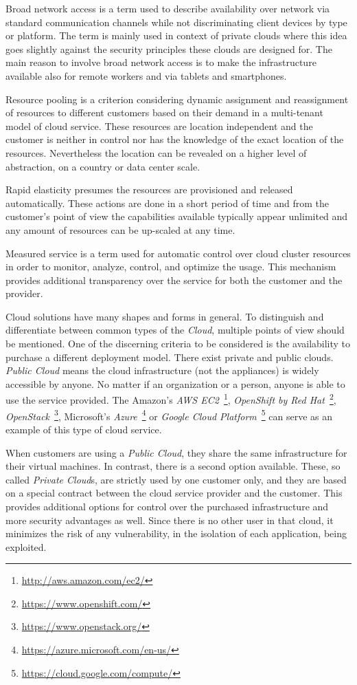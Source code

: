 Broad network access is a term used to describe availability over network via standard communication channels while not discriminating client devices by type or platform. The term is mainly used in context of private clouds where this idea goes slightly against the security principles these clouds are designed for. The main reason to involve broad network access is to make the infrastructure available also for remote workers and via tablets and smartphones.

Resource pooling is a criterion considering dynamic assignment and reassignment of resources to different customers based on their demand in a multi-tenant model of cloud service. These resources are location independent and the customer is neither in control nor has the knowledge of the exact location of the resources. Nevertheless the location can be revealed on a higher level of abstraction, on a country or data center scale.

Rapid elasticity presumes the resources are provisioned and released automatically. These actions are done in a short period of time and from the customer's point of view the capabilities available typically appear unlimited and any amount of resources can be up-scaled at any time.

Measured service is a term used for automatic control over cloud cluster resources in order to monitor, analyze, control, and optimize the usage. This mechanism provides additional transparency over the service for both the customer and the provider.

Cloud solutions have many shapes and forms in general\cite{hassan}. To distinguish and differentiate between common types of the \emph{Cloud}, multiple points of view should be mentioned. One of the discerning criteria to be considered is the availability to purchase a different deployment model. There exist private and public clouds. \emph{Public Cloud} means the cloud infrastructure (not the appliances) is widely accessible by anyone. No matter if an organization or a person, anyone is able to use the service provided. The Amazon's \emph{AWS EC2}~\footnote{\url{http://aws.amazon.com/ec2/}}, \emph{OpenShift by Red Hat}~\footnote{\url{https://www.openshift.com/}},  \emph{OpenStack}~\footnote{\url{https://www.openstack.org/}}, Microsoft's \emph{Azure}~\footnote{\url{https://azure.microsoft.com/en-us/}} or \emph{Google Cloud Platform}~\footnote{\url{https://cloud.google.com/compute/}} can serve as an example of this type of cloud service.

When customers are using a \emph{Public Cloud}, they share the same infrastructure for their virtual machines. In contrast, there is a second option available. These, so called \emph{Private Cloud}s, are strictly used by one customer only, and they are based on a special contract between the cloud service provider and the customer. This provides additional options for control over the purchased infrastructure and more security advantages as well. Since there is no other user in that cloud, it minimizes the risk of any vulnerability, in the isolation of each application, being exploited.

